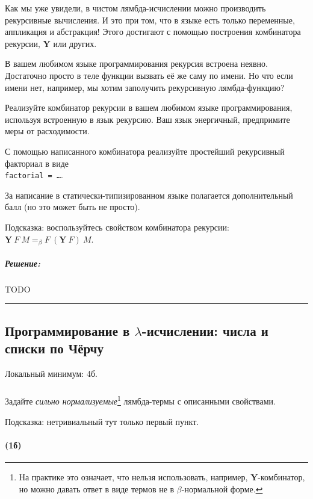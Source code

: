\documentclass{article}
\newenvironment{proof}{\subparagraph{\hspace{-1em}Решение:\newline}}{\par\noindent\rule{\textwidth}{0.4pt}}
\newcommand{\comb}[1]{\mathbf{#1}}
\newcommand{\eqbeta}{=_\beta}
\renewcommand{\emph}[1]{{\color{blue} \textit{#1}}}
\begin{document}
    Как мы уже увидели, в чистом лямбда-исчислении можно производить рекурсивные вычисления.
    И это при том, что в языке есть только переменные, аппликация и абстракция!
    Этого достигают с помощью построения комбинатора рекурсии, $\comb{Y}$ или других.

    В вашем любимом языке программирования рекурсия встроена неявно.
    Достаточно просто в теле функции вызвать её же саму по имени.
    Но что если имени нет, например, мы хотим заполучить рекурсивную лямбда-функцию?

    Реализуйте комбинатор рекурсии в вашем любимом языке программирования, используя встроенную в язык рекурсию.
    Ваш язык энергичный, предпримите меры от расходимости.

    С помощью написанного комбинатора реализуйте простейший рекурсивный факториал в виде \\ \texttt{factorial = \ldots}.

    За написание в статически-типизированном языке полагается дополнительный балл (но это может быть не просто).

    Подсказка: воспользуйтесь свойством комбинатора рекурсии: $\comb{Y}~F~M \eqbeta F~(\comb{Y}~F)~M$.

    \begin{proof}
        TODO %
    \end{proof}

    \subsection{Программирование в $\lambda$-исчислении: числа и списки по Чёрчу}

    Локальный минимум: 4б.

    \subsubsection{}

    Задайте \emph{сильно нормализуемые}\footnote{На практике это означает, что нельзя использовать, например, $\comb{Y}$-комбинатор, но можно давать ответ в виде термов не в $\beta$-нормальной форме.} лямбда-термы с описанными свойствами.

    Подсказка: нетривиальный тут только первый пункт.

    \paragraph{(1б)}
\end{document}
